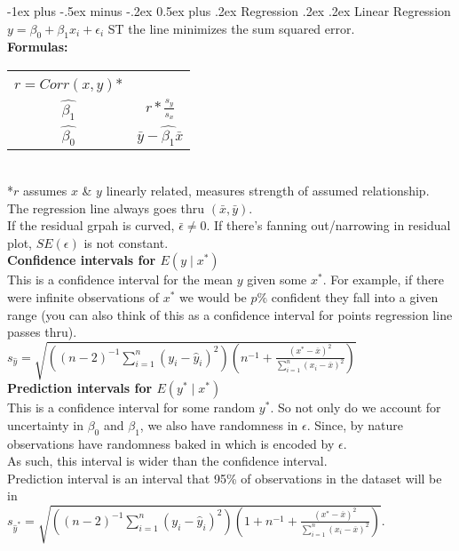 \documentclass[10pt,landscape]{article}
\makeatletter
\renewcommand{\section}{\@startsection{section}{1}{0mm}%
                                {-1ex plus -.5ex minus -.2ex}%
                                {0.5ex plus .2ex}%
                                {\normalfont\large\bfseries}}
\renewcommand{\subsection}{\@startsection{subsection}{2}{0mm}%
                                {.2ex}%
                                {.2ex}%
                                {\normalfont\normalsize\bfseries}}
\makeatother
\begin{document}
\begin{multicols}{3}
\section{Regression}
\subsection{Linear Regression}
$y = \beta_0 + \beta_1x_i + \epsilon_i$ ST the line minimizes the sum squared error. \\
\textbf{Formulas:} \\
\begin{tabular}{@{}c@{}c@{}}
        $r = Corr(x, y)$* & \hskip.5em $\frac{1}{n - 1}\sum_{i = 1}^{n}\frac{x_i-\bar{x}}{s_x}\frac{y_i-\bar{y}}{s_y}$\\
        $\hat{\beta_1}$ & $r * \frac{s_y}{s_x}$ \\        
        $\hat{\beta_0}$ & $\bar{y} - \hat{\beta_1}\bar{x}$ \\        
\end{tabular} \\
        *$r$ assumes $x$ \& $y$ linearly related, measures strength of assumed relationship. \\
        The regression line always goes thru $(\bar{x}, \bar{y})$. \\
        If the residual grpah is curved, $\bar{\epsilon} \ne 0$. If there's fanning out/narrowing in residual plot, $SE(\epsilon)$ is not constant. \\
        \textbf{Confidence intervals for $E(y \mid x^*)$} \\
        This is a confidence interval for the mean $y$ given some $x^*$. 
        For example, if there were infinite observations of $x^*$ we would be $p\%$ confident they fall into a given range (you can also think of this as a confidence interval for points regression line passes thru). \\
        $s_{\hat{y}} = \sqrt{\left((n-2)^{-1} \sum_{i=1}^n(y_i - \hat{y}_i)^2\right)\left(n^{-1} + \frac{(x^* - \overline{x})^2}{\sum_{i = 1}^n (x_i - \overline{x})^2} \right)}$ \\
        \textbf{Prediction intervals for $E(y^* \mid x^*)$} \\
        This is a confidence interval for some random $y^*$. So not only do we account for uncertainty in $\beta_0$ and $\beta_1$, we also have randomness in $\epsilon$. Since, by nature observations have randomness baked in which is encoded by $\epsilon$. \\
        As such, this interval is wider than the confidence interval. \\
        Prediction interval is an interval that 95\% of observations in the dataset will be in \\
        $s_{\hat{y}^*} = \sqrt{\left((n-2)^{-1} \sum_{i=1}^n(y_i - \hat{y}_i)^2\right)\left(1 + n^{-1} + \frac{(x^* - \overline{x})^2}{\sum_{i = 1}^n (x_i - \overline{x})^2} \right)}$. \\

\end{multicols}
\end{document}
